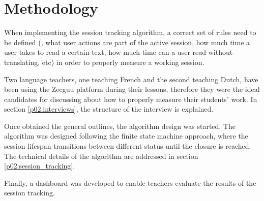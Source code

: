 \chapter{Methodology}\label{p02:implementation}
When implementing the session tracking algorithm, a correct set of rules need to be defined (\eg, what user actions are part of the active session, how much time a user takes to read a certain text, how much time can a user read without translating, etc) in order to properly measure a working session.

Two language teachers, one teaching French and the second teaching Dutch, have been using the Zeeguu platform during their lessons, therefore they were the ideal candidates for discussing about how to properly measure their students' work. In section \ref{p02:interviews}, the structure of the interview is explained.

Once obtained the general outlines, the algorithm design was started. The algorithm was designed following the finite state machine approach, where the session lifespan transitions between different status until the closure is reached. The technical details of the algorithm are addressed in section \ref{p02:session_tracking}.

Finally, a dashboard was developed to enable teachers evaluate the results of the session tracking.


